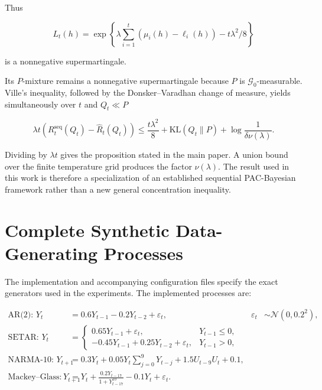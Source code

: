 \documentclass[12pt,draftclsnofoot,onecolumn]{IEEEtran}
\begin{document}
	Thus
	
	\begin{equation}
		L_t(h)=
		\exp
		\left\{
		\lambda
		\sum_{i=1}^{t}
		(\mu_i(h)-\ell_i(h))
		-t\lambda^2/8
		\right\}
	\end{equation}
	
	is a nonnegative supermartingale.
	
	Its $P$-mixture remains a nonnegative supermartingale because $P$ is $\mathcal G_0$-measurable. Ville's inequality, followed by the Donsker--Varadhan change of measure, yields simultaneously over $t$ and $Q_t\ll P$
	
	\begin{equation}
		\lambda t
		\left(
		R_t^{\mathrm{seq}}(Q_t)
		-\widehat R_t(Q_t)
		\right)
		\le
		\frac{t\lambda^2}{8}
		+
		\mathrm{KL}(Q_t\|P)
		+
		\log\frac1{\delta\nu(\lambda)} .
	\end{equation}
	
	Dividing by $\lambda t$ gives the proposition stated in the main paper. A union bound over the finite temperature grid produces the factor $\nu(\lambda)$.
	The result used in this work is therefore a specialization of an established sequential PAC-Bayesian framework rather than a new general concentration inequality.	
	
	\section{Complete Synthetic Data-Generating Processes}
	\label{sup:dgp}
	
	The implementation and accompanying configuration files specify the exact generators used in the experiments. The implemented processes are:
	
	\begin{align}
		\text{AR(2): }Y_t&=0.6Y_{t-1}-0.2Y_{t-2}+\varepsilon_t,
		&
		\varepsilon_t&\sim\mathcal N(0,0.2^2),
		\\
		\text{SETAR: }Y_t&=
		\begin{cases}
			0.65Y_{t-1}+\varepsilon_t,&Y_{t-1}\le0,\\
			-0.45Y_{t-1}+0.25Y_{t-2}+\varepsilon_t,&Y_{t-1}>0,
		\end{cases}
		\\
		\text{NARMA-10: }Y_{t+1}
		&=
		0.3Y_t+
		0.05Y_t\sum_{j=0}^{9}Y_{t-j}
		+1.5U_{t-9}U_t+0.1,
		\\
		\text{Mackey--Glass: }Y_{t+1}
		&=
		Y_t+
		\frac{0.2Y_{t-17}}
		{1+Y_{t-17}^{10}}
		-0.1Y_t+\varepsilon_t .
	\end{align}
	
\end{document}
